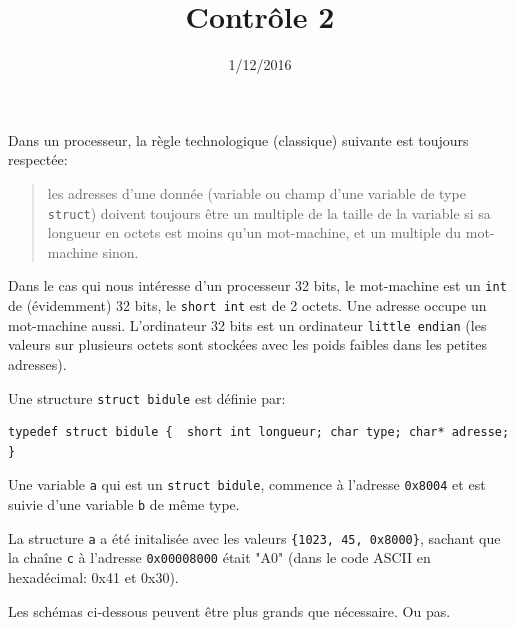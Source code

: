 \documentclass[a4paper]{iutvexam}
\title{Contrôle 2}
\date{1/12/2016}
\begin{document}
\begin{questions}

  Dans un processeur, la règle technologique (classique) suivante est
  toujours respectée:
  \begin{quote}
    les adresses d'une donnée (variable ou champ d'une variable de type
    \texttt{struct}) doivent toujours être un multiple de la taille de
    la variable si sa longueur en octets est moins qu'un mot-machine, et
    un multiple du mot-machine sinon.
  \end{quote}

  Dans le cas qui nous intéresse d'un processeur 32 bits, le mot-machine
  est un \texttt{int} de (évidemment) 32 bits, le \texttt{short int} est
  de 2 octets. Une adresse occupe un mot-machine aussi. L'ordinateur 32
  bits est un ordinateur \texttt{little endian} (les valeurs sur
  plusieurs octets sont stockées avec les poids faibles dans les petites
  adresses).

  Une structure \texttt{struct bidule} est définie par:

\begin{verbatim}
typedef struct bidule {  short int longueur; char type; char* adresse; }
\end{verbatim}

  Une variable \texttt{a} qui est un \texttt{struct bidule}, commence à l'adresse \texttt{0x8004} et est suivie d'une variable \texttt{b} de même type.


  La structure \texttt{a} a été initalisée avec les valeurs \verb|{1023, 45, 0x8000}|, sachant que la chaîne \texttt{c} à l'adresse \texttt{0x00008000} était "A0" (dans le code ASCII en hexadécimal: 0x41 et 0x30).

  Les schémas ci-dessous peuvent être plus grands que nécessaire. Ou pas.

\end{questions}
\end{document}
